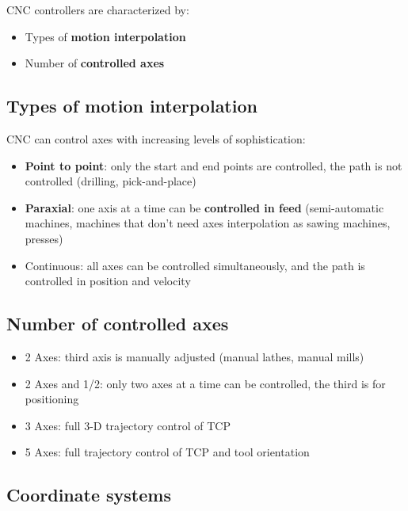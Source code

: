 \documentclass[
  letterpaper,
  DIV=11,
  numbers=noendperiod]{scrartcl}
\providecommand{\tightlist}{%
  \setlength{\itemsep}{0pt}\setlength{\parskip}{0pt}}
\begin{document}
CNC controllers are characterized by:

\begin{itemize}
\tightlist
\item
  Types of \textbf{motion interpolation}
\item
  Number of \textbf{controlled axes}
\end{itemize}

\subsection{Types of motion
interpolation}\label{types-of-motion-interpolation}

CNC can control axes with increasing levels of sophistication:

\begin{itemize}
\tightlist
\item
  \textbf{Point to point}: only the start and end points are controlled,
  the path is not controlled (drilling, pick-and-place)
\item
  \textbf{Paraxial}: one axis at a time can be \textbf{controlled in
  feed} (semi-automatic machines, machines that don't need axes
  interpolation as sawing machines, presses)
\item
  {Continuous}: all axes can be controlled simultaneously, and the path
  is controlled in position and velocity
\end{itemize}

\subsection{Number of controlled axes}\label{number-of-controlled-axes}

\begin{itemize}
\tightlist
\item
  2 Axes: third axis is manually adjusted (manual lathes, manual mills)
\item
  2 Axes and 1/2: only two axes at a time can be controlled, the third
  is for positioning
\item
  3 Axes: full 3-D trajectory control of TCP
\item
  5 Axes: full trajectory control of TCP and tool orientation
\end{itemize}

\subsection{Coordinate systems}\label{coordinate-systems}
\end{document}
